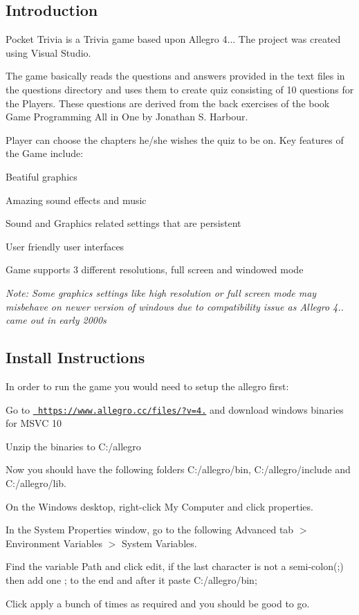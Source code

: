 \subsection*{Introduction}

Pocket Trivia is a Trivia game based upon Allegro 4... The project was created using Visual Studio.

The game basically reads the questions and answers provided in the text files in the questions directory and uses them to create quiz consisting of 10 questions for the Players. These questions are derived from the back exercises of the book Game Programming All in One by Jonathan S. Harbour.

Player can choose the chapters he/she wishes the quiz to be on. Key features of the Game include\+:
\begin{DoxyItemize}
\item Beatiful graphics
\item Amazing sound effects and music
\item Sound and Graphics related settings that are persistent
\item User friendly user interfaces
\item Game supports 3 different resolutions, full screen and windowed mode
\end{DoxyItemize}

{\itshape Note\+: Some graphics settings like high resolution or full screen mode may misbehave on newer version of windows due to compatibility issue as Allegro 4.. came out in early 2000s}

\subsection*{Install Instructions}

In order to run the game you would need to setup the allegro first\+:


\begin{DoxyEnumerate}
\item Go to \href{https://www.allegro.cc/files/?v=4.4}{\texttt{ https\+://www.\+allegro.\+cc/files/?v=4.}} and download windows binaries for M\+S\+VC 10
\item Unzip the binaries to C\+:/allegro
\item Now you should have the following folders C\+:/allegro/bin, C\+:/allegro/include and C\+:/allegro/lib.
\item On the Windows desktop, right-\/click My Computer and click properties.
\item In the System Properties window, go to the following Advanced tab $>$ Environment Variables $>$ System Variables.
\item Find the variable Path and click edit, if the last character is not a semi-\/colon(;) then add one ; to the end and after it paste C\+:/allegro/bin;
\item Click apply a bunch of times as required and you should be good to go.
\end{DoxyEnumerate}


